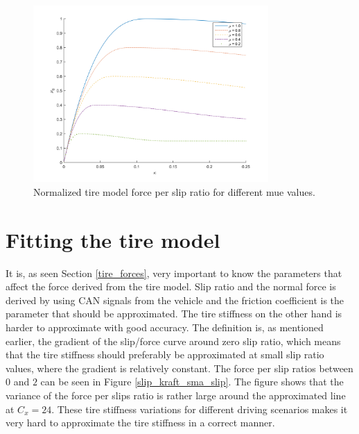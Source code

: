 \begin{figure}[h]
	\centering
	\includegraphics[width=0.8\textwidth]{Pictures/slipkraft_olika_mue}
	\caption {Normalized tire model force per slip ratio for different mue values.}
	\label{different_mue}
\end{figure}

\section{Fitting the tire model}
It is, as seen Section \ref{tire_forces}, very important to know the parameters that affect the force derived from the tire model. Slip ratio and the normal force is derived by using CAN signals from the vehicle and the friction coefficient is the parameter that should be approximated. The tire stiffness on the other hand is harder to approximate with good accuracy. The definition is, as mentioned earlier, the gradient of the slip/force curve around zero slip ratio, which means that the tire stiffness should preferably be approximated at small slip ratio values, where the gradient is relatively constant. The force per slip ratios between $ 0 $ and $ 2 $ can be seen in Figure \ref{slip_kraft_sma_slip}. The figure shows that the variance of the force per slips ratio is rather large around the approximated line at $ C_{x} = 24 $. These tire stiffness variations for different driving scenarios makes it very hard to approximate the tire stiffness in a correct manner.

